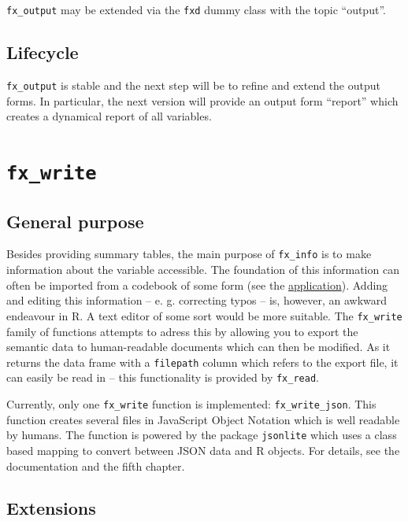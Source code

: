 \documentclass[]{report}
\theoremstyle{definition}
\theoremstyle{definition}
\theoremstyle{definition}
\theoremstyle{remark}
\begin{document}
\texttt{fx\_output} may be extended via the \texttt{fxd} dummy class
with the topic ``output''.

\subsection{Lifecycle}\label{lifecycle-2}

\texttt{fx\_output} is stable and the next step will be to refine and
extend the output forms. In particular, the next version will provide an
output form ``report'' which creates a dynamical report of all
variables.

\section{\texorpdfstring{\texttt{fx\_write}}{fx\_write}}\label{fx_write}

\subsection{General purpose}\label{general-purpose-3}

Besides providing summary tables, the main purpose of \texttt{fx\_info}
is to make information about the variable accessible. The foundation of
this information can often be imported from a codebook of some form (see
the \protect\hyperlink{application}{application}). Adding and editing
this information -- e. g. correcting typos -- is, however, an awkward
endeavour in R. A text editor of some sort would be more suitable. The
\texttt{fx\_write} family of functions attempts to adress this by
allowing you to export the semantic data to human-readable documents
which can then be modified. As it returns the data frame with a
\texttt{filepath} column which refers to the export file, it can easily
be read in -- this functionality is provided by \texttt{fx\_read}.

Currently, only one \texttt{fx\_write} function is implemented:
\texttt{fx\_write\_json}. This function creates several files in
JavaScript Object Notation which is well readable by humans. The
function is powered by the package \texttt{jsonlite} \citep{jsonlite}
which uses a class based mapping to convert between JSON data and R
objects. For details, see the documentation and the fifth chapter.

\subsection{Extensions}\label{extensions-3}
\end{document}
